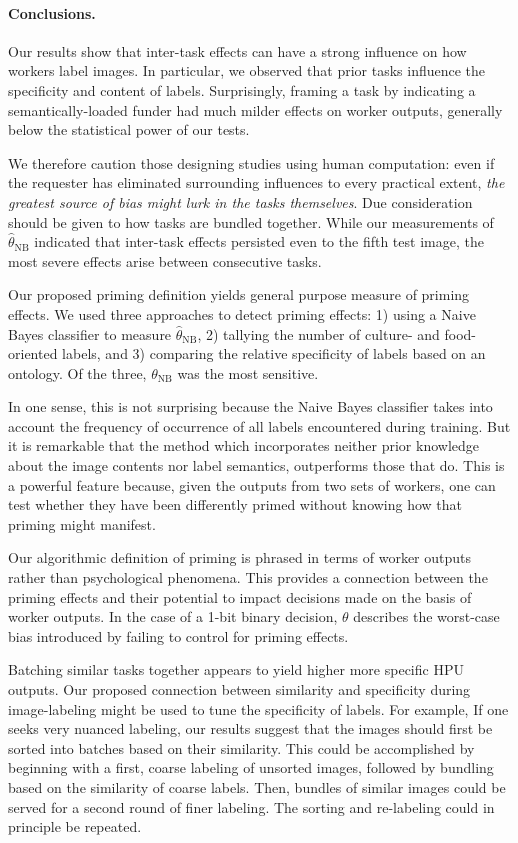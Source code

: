 \documentclass[12pt]{article}
\begin{document}
\paragraph{Conclusions.}
Our results show that inter-task effects can have a strong influence on how 
workers label images. In particular, we observed that prior tasks influence 
the specificity and content of labels. Surprisingly, framing a task by 
indicating a semantically-loaded funder had much milder effects on worker 
outputs, generally below the statistical power of our tests.

We therefore caution those designing studies using human computation: even if 
the requester has eliminated surrounding influences to every practical extent, 
\textit{the greatest source of bias might lurk in the tasks themselves}. Due 
consideration should be given to how tasks are bundled together. While our 
measurements of $\hat{\theta}_\mathrm{NB}$ indicated that inter-task effects 
persisted even to the fifth test image, the most severe effects arise between 
consecutive tasks.

Our proposed priming definition yields general purpose measure of priming 
effects. We used three approaches to detect priming effects: 1) using a Naive 
Bayes classifier to measure $\hat{\theta}_\mathrm{NB}$, 2) tallying the 
number of culture- and food-oriented labels, and 3) comparing the relative
specificity of labels based on an ontology. Of the three, $\theta_\mathrm{NB}$ 
was the most sensitive.

In one sense, this is not surprising because the Naive Bayes classifier takes 
into account the frequency of occurrence of all labels encountered during 
training. But it is remarkable that the method which incorporates neither 
prior knowledge about the image contents nor label semantics, outperforms 
those that do. This is a powerful feature because, given the outputs from two 
sets of workers, one can test whether they have been differently primed 
without knowing how that priming might manifest.

Our algorithmic definition of priming is phrased in terms of worker outputs 
rather than psychological phenomena. This provides a connection between the 
priming effects and their potential to impact decisions made on the basis of 
worker outputs. In the case of a 1-bit binary decision, $\theta$ describes the 
worst-case bias introduced by failing to control for priming effects.

Batching similar tasks together appears to yield higher more specific HPU 
outputs. Our proposed connection between similarity and specificity during 
image-labeling might be used to tune the specificity of labels. For example, 
If one seeks very nuanced labeling, our results suggest that the images 
should first be sorted into batches based on their similarity. This could be 
accomplished by beginning with a first, coarse labeling of unsorted images, 
followed by bundling based on the similarity of coarse labels. Then, bundles 
of similar images could be served for a second round of finer labeling. The 
sorting and re-labeling could in principle be repeated.
\end{document}
